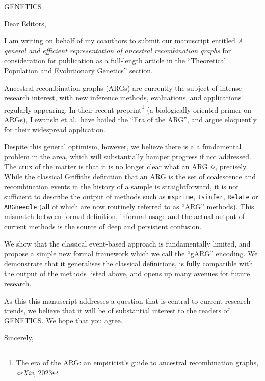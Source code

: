 \documentclass{letter}
\begin{document}
\begin{letter}{GENETICS}

\opening{Dear Editors,}

I am writing on behalf of my coauthors to submit our manuscript entitled
\emph{A general and efficient representation of ancestral recombination graphs}
for consideration for publication as a
full-length article in the
``Theoretical Population and Evolutionary Genetics'' section.

Ancestral recombination graphs (ARGs) are currently the subject of
intense research interest, with new inference methods, evaluations,
and applications regularly appearing.
In their recent preprint\footnote{The era of the ARG:
an empiricist’s guide to ancestral recombination graphs, \emph{arXiv}, 2023}
 (a biologically oriented primer
on ARGs), Lewanski et al.\ have hailed the ``Era of the ARG'', and
argue eloquently for their widespread application.

Despite this general optimism, however, we believe there is a
a fundamental problem in the area, which will substantially hamper
progress if not addressed.
The crux of the matter is that it is no longer clear
what an ARG \emph{is}, precisely.
While the classical Griffiths definition that
an ARG is the set of coalescence and recombination events
in the history of a sample is straightforward,
it is not sufficient to describe the output of methods
such as \texttt{msprime}, \texttt{tsinfer}, \texttt{Relate}
or \texttt{ARGneedle} (all of which are now routinely
referred to as ``ARG'' methods). This mismatch
between formal definition, informal usage and the
actual output of current methods is the source of deep
and persistent confusion.

We show that the classical event-based approach is
fundamentally limited, and propose a simple new
formal framework which we call the ``gARG''
encoding. We demonstrate that it generalises
the classical definitions, is fully compatible
with the output of the methods listed above,
and opens up many avenues for future research.

As this this manuscript addresses a question
that is central to current research trends,
we believe that it will be of substantial interest
to the readers of GENETICS. We hope that you agree.


\closing{Sincerely,}

\end{letter}
\end{document}

